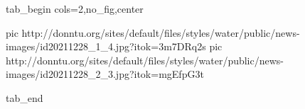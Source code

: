  
 
 
 
 


\ifcmt
  tab_begin cols=2,no_fig,center

     pic http://donntu.org/sites/default/files/styles/water/public/news-images/id20211228_1_4.jpg?itok=3m7DRq2s
		 pic http://donntu.org/sites/default/files/styles/water/public/news-images/id20211228_2_3.jpg?itok=mgEfpG3t

  tab_end
\fi
